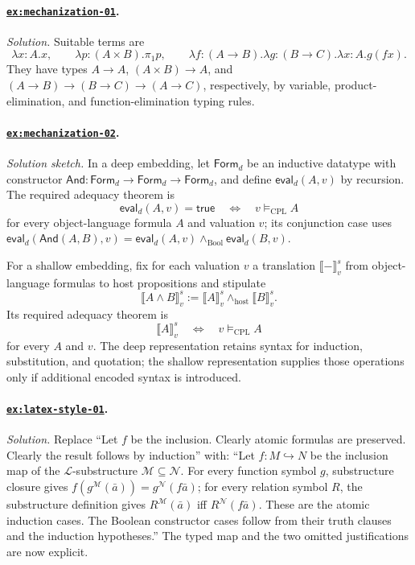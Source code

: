 \documentclass[11pt,oneside,openany]{book}
\theoremstyle{definition}
\theoremstyle{plain}
\theoremstyle{remark}
\newcommand{\Lang}{\mathcal{L}}
\newcommand{\entails}{\models}
\newcommand{\defeq}{\mathrel{:=}}
\begin{document}
\paragraph{\hyperref[ex:mechanization-01]{\texttt{ex:mechanization-01}}.}
\textit{Solution.}  Suitable terms are
\[
\lambda x{:}A.x,\qquad
\lambda p{:}(A\times B).\pi_1p,\qquad
\lambda f{:}(A\to B).\lambda g{:}(B\to C).\lambda x{:}A.g(fx).
\]
They have types \(A\to A\), \((A\times B)\to A\), and
\((A\to B)\to(B\to C)\to(A\to C)\), respectively, by variable,
product-elimination, and function-elimination typing rules.

\paragraph{\hyperref[ex:mechanization-02]{\texttt{ex:mechanization-02}}.}
\textit{Solution sketch.}  In a deep embedding, let
\(\mathsf{Form}_{d}\) be an inductive datatype with constructor
\(\mathsf{And}:\mathsf{Form}_{d}\to\mathsf{Form}_{d}\to\mathsf{Form}_{d}\),
and define \(\mathsf{eval}_{d}(A,v)\) by recursion.  The required adequacy
theorem is
\[
  \mathsf{eval}_{d}(A,v)=\mathsf{true}
  \quad\Longleftrightarrow\quad
  v\entails_{\mathrm{CPL}} A
\]
for every object-language formula \(A\) and valuation \(v\); its conjunction
case uses
\(\mathsf{eval}_{d}(\mathsf{And}(A,B),v)=
 \mathsf{eval}_{d}(A,v)\land_{\mathrm{Bool}}\mathsf{eval}_{d}(B,v)\).

For a shallow embedding, fix for each valuation \(v\) a translation
\(\llbracket-\rrbracket^{s}_{v}\) from object-language formulas to host
propositions and stipulate
\[
  \llbracket A\land B\rrbracket^{s}_{v}
  \defeq
  \llbracket A\rrbracket^{s}_{v}\land_{\mathrm{host}}
  \llbracket B\rrbracket^{s}_{v}.
\]
Its required adequacy theorem is
\[
  \llbracket A\rrbracket^{s}_{v}
  \quad\Longleftrightarrow\quad
  v\entails_{\mathrm{CPL}}A
\]
for every \(A\) and \(v\).  The deep representation retains syntax for
induction, substitution, and quotation; the shallow representation supplies
those operations only if additional encoded syntax is introduced.

\paragraph{\hyperref[ex:latex-style-01]{\texttt{ex:latex-style-01}}.}
\textit{Solution.}  Replace ``Let \(f\) be the inclusion.  Clearly atomic
formulas are preserved.  Clearly the result follows by induction'' with:
``Let \(f:M\hookrightarrow N\) be the inclusion map of the
\(\Lang\)-substructure \(\mathcal M\subseteq\mathcal N\).  For every function
symbol \(g\), substructure closure gives
\(f(g^{\mathcal M}(\bar a))=g^{\mathcal N}(f\bar a)\); for every relation
symbol \(R\), the substructure definition gives
\(R^{\mathcal M}(\bar a)\) iff \(R^{\mathcal N}(f\bar a)\).  These are the
atomic induction cases.  The Boolean constructor cases follow from their truth
clauses and the induction hypotheses.''  The typed map and the two omitted
justifications are now explicit.
\end{document}
